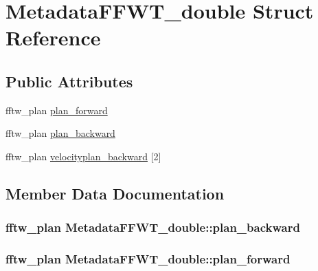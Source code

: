\hypertarget{struct_metadata_f_f_w_t__double}{}\section{Metadata\+F\+F\+W\+T\+\_\+double Struct Reference}
\label{struct_metadata_f_f_w_t__double}
\subsection*{Public Attributes}
\begin{DoxyCompactItemize}
\item 
fftw\+\_\+plan \hyperlink{struct_metadata_f_f_w_t__double_ac1bec2d6091a935183d1645111ab6b25}{plan\+\_\+forward}
\item 
fftw\+\_\+plan \hyperlink{struct_metadata_f_f_w_t__double_aaf79e0d1d9cf993d41762a13ab8254df}{plan\+\_\+backward}
\item 
fftw\+\_\+plan \hyperlink{struct_metadata_f_f_w_t__double_ade6f127e609361c0c5a785a661c94fd5}{velocityplan\+\_\+backward} \mbox{[}2\mbox{]}
\end{DoxyCompactItemize}


\subsection{Member Data Documentation}
\hypertarget{struct_metadata_f_f_w_t__double_aaf79e0d1d9cf993d41762a13ab8254df}{}
\subsubsection[{plan\+\_\+backward}]{\setlength{\rightskip}{0pt plus 5cm}fftw\+\_\+plan Metadata\+F\+F\+W\+T\+\_\+double\+::plan\+\_\+backward}\label{struct_metadata_f_f_w_t__double_aaf79e0d1d9cf993d41762a13ab8254df}
\hypertarget{struct_metadata_f_f_w_t__double_ac1bec2d6091a935183d1645111ab6b25}{}
\subsubsection[{plan\+\_\+forward}]{\setlength{\rightskip}{0pt plus 5cm}fftw\+\_\+plan Metadata\+F\+F\+W\+T\+\_\+double\+::plan\+\_\+forward}\label{struct_metadata_f_f_w_t__double_ac1bec2d6091a935183d1645111ab6b25}
\hypertarget{struct_metadata_f_f_w_t__double_ade6f127e609361c0c5a785a661c94fd5}{}
